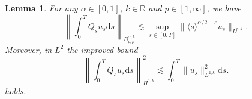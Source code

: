 \documentclass[11pt, a4paper]{scrartcl}
\numberwithin{equation}{section}
\theoremstyle{plain}
\newtheorem{lemma}[foo]{Lemma}
\theoremstyle{remark}
\newcommand{\mathd}{\mathrm{d}}
\newcommand{\nosymbol}{}
\begin{document}
\begin{lemma}
  \label{lem:I(u)-regularity}For any $\alpha \in [0, 1]$, $k \in \mathbb{R}$
  and $p \in [1, \infty]$, we have
  \begin{equation}
    \left\| \int_0^T Q_s u_s \mathd s \right\|_{B_{p, p}^{\alpha, k}} \lesssim
    \sup_{s \in [0, T]} \| \langle s \rangle^{\alpha / 2 + \varepsilon} u_s
    \|_{L^{p, k}} . \label{eq:Iu-Bp}
  \end{equation}
  Moreover, in $L^2$ the improved bound
  \begin{equation}
    \left\| \int_0^T Q_s u_s \mathd s_{\nosymbol} \right\|_{H^{1, k}}^2
    \lesssim \int_0^T \| u_s \|_{L^{2, k}}^2 \mathd s. \label{eq:Iu-H1}
  \end{equation}
  holds.
\end{lemma}
\end{document}
